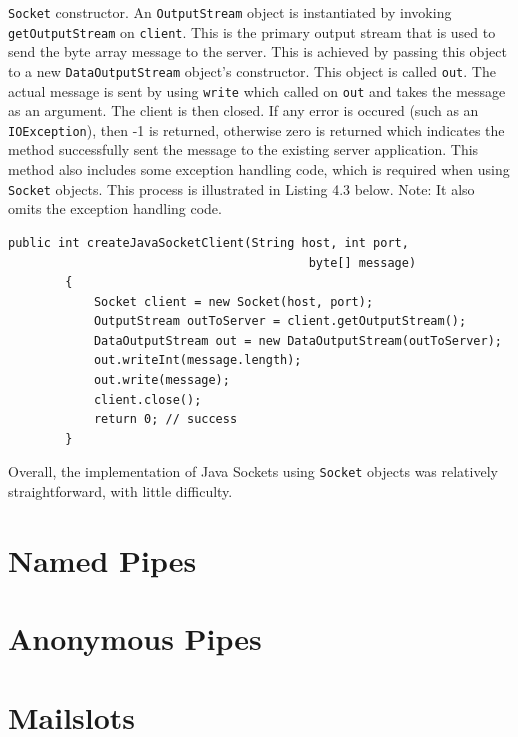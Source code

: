 \documentclass[12pt] {newrucsthesis}    %
\def\code#1{\texttt{#1}}
\begin{document}
      \code{Socket} constructor. An \code{OutputStream} object is instantiated by invoking \code{getOutputStream}
      on \code{client}. This is the primary output stream that is used to send the byte array message to the
      server. This is achieved by passing this object to a new \code{DataOutputStream} object's constructor. This
      object is called \code{out}. The actual message is sent by
      using \code{write} which called on \code{out} and takes the message as an argument.
      The client is then closed. If any error is occured (such as an \code{IOException}), then -1 is returned,
      otherwise zero is returned which indicates the method successfully sent the message to the existing
      server application. This method also includes some exception handling code, which is required when using
      \code{Socket} objects. This process is illustrated in Listing 4.3 below. Note: It also omits the exception
      handling code.

      \begin {lstlisting}[caption=Java Sockets: \code{createJavaSocketClient}]
        public int createJavaSocketClient(String host, int port,
                                          byte[] message)
        {
            Socket client = new Socket(host, port);
            OutputStream outToServer = client.getOutputStream();
            DataOutputStream out = new DataOutputStream(outToServer);
            out.writeInt(message.length);
            out.write(message);
            client.close();
            return 0; // success
        }
      \end{lstlisting}

      Overall, the implementation of Java Sockets using \code{Socket} objects was
      relatively straightforward, with little difficulty. 



    \section{Named Pipes} \label{npsection}

    \section{Anonymous Pipes} \label{anonpipesection}

    \section{Mailslots} \label{mssection}
\end{document}
